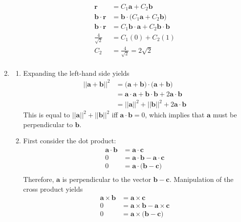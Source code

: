 \documentclass{article}
\begin{document}
\begin{enumerate}
\begin{enumerate}
\begin{align*}
\mathbf{r} &= C_1 \mathbf{a} + C_2  \mathbf{b} \\
\mathbf{b}\cdot\mathbf{r} &=  \mathbf{b}\cdot \Big(C_1 \mathbf{a} + C_2 \mathbf{b} \Big)\\
\mathbf{b}\cdot\mathbf{r} &= C_1 \mathbf{b}\cdot \mathbf{a} + C_2\mathbf{b}\cdot   \mathbf{b} \\
\frac{4}{\sqrt{2}} &= C_1 (0) + C_2(1) \\
C_2 &= \frac{4}{\sqrt{2}} = 2\sqrt{2} \\
\end{align*}
\end{enumerate}
\item
\begin{enumerate}
\item Expanding the left-hand side yields
\begin{align*}
||\mathbf{a} + \mathbf{b}||^2 &= \big(\mathbf{a} + \mathbf{b}\big)\cdot\big(\mathbf{a} + \mathbf{b}\big) \\
&= \mathbf{a}\cdot\mathbf{a} + \mathbf{b}\cdot\mathbf{b} + 2\mathbf{a}\cdot\mathbf{b}\\
&= ||\mathbf{a}||^2 + ||\mathbf{b}||^2 + 2\mathbf{a}\cdot\mathbf{b}
\end{align*}
This is equal to $ ||\mathbf{a}||^2 + ||\mathbf{b}||^2$ iff $\mathbf{a}\cdot\mathbf{b}=0$, which implies that $\mathbf{a}$ must be perpendicular to $\mathbf{b}$.
\item First consider the dot product:
\begin{align*}
\mathbf{a}\cdot\mathbf{b} &= \mathbf{a}\cdot\mathbf{c} \\
0 &= \mathbf{a}\cdot\mathbf{b} - \mathbf{a}\cdot\mathbf{c} \\
0 &= \mathbf{a}\cdot\big(\mathbf{b} - \mathbf{c}\big) \\
\end{align*}
Therefore, $\mathbf{a}$ is perpendicular to the vector $\mathbf{b} - \mathbf{c}$. Manipulation of the cross product yields
\begin{align*}
\mathbf{a}\times\mathbf{b} &= \mathbf{a}\times\mathbf{c} \\
0 &= \mathbf{a}\times\mathbf{b} - \mathbf{a}\times\mathbf{c} \\
0 &= \mathbf{a}\times\big(\mathbf{b} - \mathbf{c}\big) \\

\end{align*}
\end{enumerate}
\end{enumerate}
\end{document}
